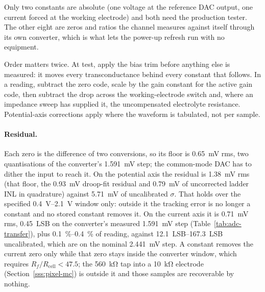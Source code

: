 Only two constants are absolute (one voltage at the reference DAC output, one
current forced at the working electrode) and both need the production tester.
The other eight are zeros and ratios the channel measures against itself through
its own converter, which is what lets the power-up refresh run with no equipment.

Order matters twice. At test, apply the bias trim before anything else is
measured: it moves every transconductance behind every constant that follows. In
a reading, subtract the zero code, scale by the gain constant for the active gain
code, then subtract the drop across the working-electrode switch and, where an
impedance sweep has supplied it, the uncompensated electrolyte resistance.
Potential-axis corrections apply where the waveform is tabulated, not per sample.



\paragraph{Residual.} Each zero is the difference of two conversions, so its
floor is \SI{0.65}{\milli\volt} rms, two quantisations of the converter's
\SI{1.591}{\milli\volt} step; the common-mode DAC has to dither the input to
reach it. On the potential axis the residual is \SI{1.38}{\milli\volt} rms
(that floor, the \SI{0.93}{\milli\volt} droop-fit residual and
\SI{0.79}{\milli\volt} of uncorrected ladder INL in quadrature) against
\SI{5.71}{\milli\volt} of uncalibrated \(\sigma\). That holds over the
specified \SIrange{0.4}{2.1}{\volt} window only: outside it the tracking error
is no longer a constant and no stored constant removes it. On the current axis it is
\SI{0.71}{\milli\volt} rms, \SI{0.45}{LSB} on the converter's measured
\SI{1.591}{\milli\volt} step (Table~\ref{tab:adc-transfer}), plus
\SIrange{0.1}{0.4}{\percent} of reading, against \SIrange{12.1}{167.3}{LSB}
uncalibrated, which are on the nominal \SI{2.441}{\milli\volt} step.
A constant removes the current zero only
while that zero stays inside the converter window, which requires
\(R_f/R_{\mathrm{cell}} < 47.5\); the \SI{560}{\kilo\ohm} tap into a
\SI{10}{\kilo\ohm} electrode (Section~\ref{sss:pixel-mc}) is outside it and those
samples are recoverable by nothing.


